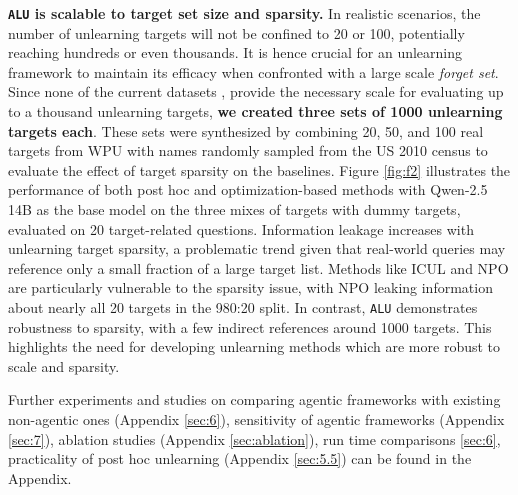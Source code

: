 \textbf{\texttt{ALU} is scalable to target set size and sparsity.}
In realistic scenarios, the number of unlearning targets will not be confined to 20 or 100,  potentially reaching hundreds or even thousands. It is hence crucial for an unlearning framework to maintain its efficacy when confronted with a large scale \emph{forget set}. Since none of the current datasets \cite{maini2024tofu}, \cite{liu2024revisitingwhosharrypotter} provide the necessary scale for evaluating up to a thousand unlearning targets, \textbf{we created three sets of 1000 unlearning targets each}. These sets were synthesized by combining 20, 50, and 100 real targets from WPU \cite{liu2024revisitingwhosharrypotter} with names randomly sampled from the US 2010 census \cite{us2010cencus} to evaluate the effect of target sparsity on the baselines. Figure \ref{fig:f2} illustrates the performance of both post hoc and optimization-based methods with Qwen-2.5 14B \cite{qwen2.5} as the base model on the three mixes of targets with dummy targets, evaluated on 20 target-related questions. Information leakage increases with unlearning target sparsity, a problematic trend given that real-world queries may reference only a small fraction of a large target list. Methods like ICUL \cite{pawelczyk2023context} and NPO \cite{zhang2024negativepreferenceoptimizationcatastrophic} are particularly vulnerable to the sparsity issue, with NPO leaking information about nearly all 20 targets in the 980:20 split. In contrast, \texttt{ALU} demonstrates robustness to sparsity, with a few indirect references around 1000 targets. This highlights the need for developing unlearning methods which are more robust to scale and sparsity.

Further experiments and studies on comparing agentic frameworks with existing non-agentic ones (Appendix \ref{sec:6}), sensitivity of agentic frameworks (Appendix \ref{sec:7}), ablation studies (Appendix \ref{sec:ablation}), run time comparisons \ref{sec:6},  practicality of post hoc unlearning (Appendix \ref{sec:5.5}) can be found in the Appendix.


